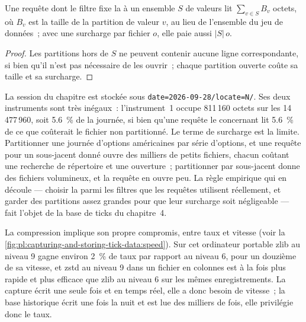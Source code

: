 \begin{proposition}[Élagage]\label{prop:pl:capturing-and-storing-tick-data:pruning}
Une requête dont le filtre fixe la  à un ensemble $S$ de valeurs lit $\sum_{v\in S} B_v$ octets, où $B_v$ est la taille de
la partition de valeur $v$, au lieu de l'ensemble du jeu de données~; avec une surcharge par fichier $o$, elle paie aussi $|S|\,o$.
\end{proposition}

\begin{proof}
Les partitions hors de $S$ ne peuvent contenir aucune ligne correspondante, si bien qu'il n'est pas nécessaire de les ouvrir~; chaque partition ouverte coûte sa taille et sa
surcharge.
\end{proof}

La session du chapitre est stockée sous \texttt{date=2026-09-28/locate=N/}. Ses deux instruments sont très inégaux~: l'instrument~1
occupe 811\,160 octets sur les 14\,477\,960, soit 5.6~\% de la journée, si bien qu'une requête le concernant lit 5.6~\% de ce que coûterait le
fichier non partitionné. Le terme de surcharge est la limite. Partitionner une journée d'options américaines par série d'options, et une requête pour un sous-jacent donné ouvre
des milliers de petits fichiers, chacun coûtant une recherche de répertoire et une ouverture~; partitionner par sous-jacent donne des fichiers volumineux, et la
requête en ouvre peu. La règle empirique qui en découle --- choisir la  parmi les filtres que les requêtes utilisent réellement, et garder
des partitions assez grandes pour que leur surcharge soit négligeable --- fait l'objet de la base de ticks du chapitre~4.

La compression implique son propre compromis, entre taux et vitesse (voir la \cref{fig:pl:capturing-and-storing-tick-data:speed}). Sur cet ordinateur portable
zlib au niveau 9 gagne environ 2~\% de taux par rapport au niveau 6, pour un douzième de sa vitesse, et zstd au niveau 9 dans un fichier en colonnes est
à la fois plus rapide et plus efficace que zlib au niveau 6 sur les mêmes enregistrements. La capture écrit une seule fois et en temps réel, elle a donc besoin de vitesse~; la base historique écrit une fois
la nuit et est lue des milliers de fois, elle privilégie donc le taux.

